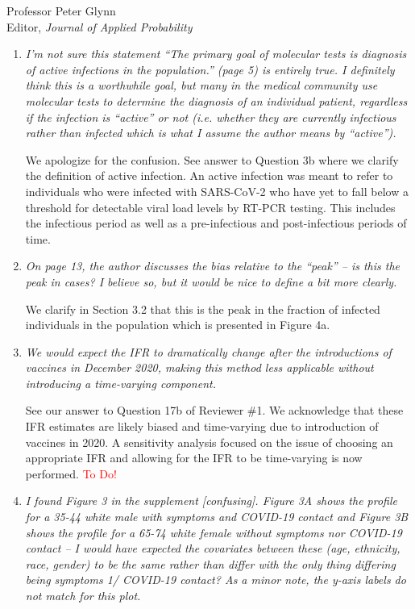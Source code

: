 \documentclass[11pt]{letter} %
\begin{document}
\begin{letter}{Professor
	Peter Glynn\\
	Editor, {\em Journal of Applied Probability}}
\begin{enumerate}
\vspace{5mm}
We now make this distinction much clearer.
\vspace{5mm}

\item {\it I’m not sure this statement “The primary goal of molecular tests is diagnosis of active infections in the population.” (page 5) is entirely true. I definitely think this is a worthwhile goal, but many in the medical community use molecular tests to determine the diagnosis of an individual patient, regardless if the infection is “active” or not (i.e. whether they are currently infectious rather than infected which is what I assume the author means by “active”).}

\vspace{5mm}
We apologize for the confusion.  See answer to Question 3b where we clarify the definition of active infection.  An active infection was meant to refer to individuals who were infected with SARS-CoV-2 who have yet to fall below a threshold for detectable viral load levels by RT-PCR testing.  This includes the infectious period as well as a pre-infectious and post-infectious periods of time.

\vspace{5mm}
\item {\it On page 13, the author discusses the bias relative to the “peak” – is this the peak in cases? I believe so, but it would be nice to define a bit more clearly.}

\vspace{5mm}
We clarify in Section 3.2 that this is the peak in the fraction of infected individuals in the population which is presented in Figure 4a.
\vspace{5mm}
\item {\it We would expect the IFR to dramatically change after the introductions of vaccines in December 2020, making this method less applicable without introducing a time-varying component.}

\vspace{5mm}
See our answer to Question 17b of Reviewer \#1. We acknowledge that these IFR estimates are likely biased and time-varying due to introduction of vaccines in 2020.  A sensitivity analysis focused on the issue of choosing an appropriate IFR and allowing for the IFR to be time-varying is now performed.
\textcolor{red}{To Do!}

\vspace{5mm}
\item {\it I found Figure 3 in the supplement [confusing]. Figure 3A shows the profile for a 35-44 white male with symptoms and COVID-19 contact and Figure 3B shows the profile for a 65-74 white female without symptoms nor COVID-19 contact – I would have expected the covariates between these (age, ethnicity, race, gender) to be the same rather than differ with the only thing differing being symptoms 1/ COVID-19 contact? As a minor note, the y-axis labels do not match for this plot.}


\end{enumerate}
\end{letter}
\end{document}
